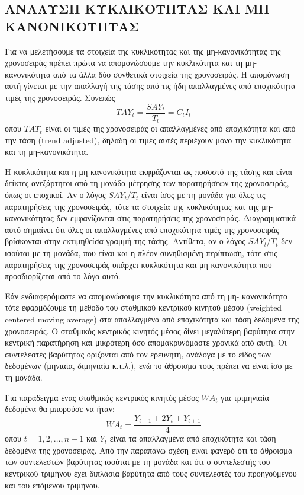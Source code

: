 \subsection{ΑΝΑΛΥΣΗ ΚΥΚΛΙΚΟΤΗΤΑΣ ΚΑΙ ΜΗ ΚΑΝΟΝΙΚΟΤΗΤΑΣ}
Για να μελετήσουμε τα στοιχεία της κυκλικότητας και της μη-κανονικότητας της
χρονοσειράς πρέπει πρώτα να απομονώσουμε την κυκλικότητα και τη μη-
κανονικότητα από τα άλλα δύο συνθετικά στοιχεία της χρονοσειράς. Η απομόνωση
αυτή γίνεται με την απαλλαγή της τάσης από τις ήδη απαλλαγμένες από εποχικότητα
τιμές της χρονοσειράς. Συνεπώς\\
$$ TAY_t=\frac{SAY_t}{T_t}=C_tI_t $$
όπου $TAΥ_t$ είναι οι τιμές της χρονοσειράς οι απαλλαγμένες από εποχικότητα και από
την τάση (trend adjusted), δηλαδή οι τιμές αυτές περιέχουν μόνο την κυκλικότητα και
τη μη-κανονικότητα.

Η κυκλικότητα και η μη-κανονικότητα εκφράζονται ως ποσοστό της τάσης και
είναι δείκτες ανεξάρτητοι από τη μονάδα μέτρησης των παρατηρήσεων της
χρονοσειράς, όπως οι εποχικοί. Αν ο λόγος $SAY_t/ T_t$ είναι ίσος με τη μονάδα για
όλες τις παρατηρήσεις της χρονοσειράς, τότε τα στοιχεία της κυκλικότητας και της
μη-κανονικότητας δεν εμφανίζονται στις παρατηρήσεις της χρονοσειράς.
Διαγραμματικά αυτό σημαίνει ότι όλες οι απαλλαγμένες από εποχικότητα τιμές της
χρονοσειράς βρίσκονται στην εκτιμηθείσα γραμμή της τάσης. Αντίθετα, αν ο λόγος
$SAY_t/ T_t$ δεν ισούται με τη μονάδα, που είναι και η πλέον συνηθισμένη περίπτωση,
τότε στις παρατηρήσεις της χρονοσειράς υπάρχει κυκλικότητα και μη-κανονικότητα
που προσδιορίζεται από το λόγο αυτό.

Εάν ενδιαφερόμαστε να απομονώσουμε την κυκλικότητα από τη μη-
κανονικότητα τότε εφαρμόζουμε τη μέθοδο του σταθμικού κεντρικού κινητού μέσου
(weighted centered moving average) στα απαλλαγμένα από εποχικότητα και τάση
δεδομένα της χρονοσειράς. Ο σταθμικός κεντρικός κινητός μέσος δίνει μεγαλύτερη
βαρύτητα στην κεντρική παρατήρηση και μικρότερη όσο απομακρυνόμαστε χρονικά
από αυτή. Οι συντελεστές βαρύτητας ορίζονται από τον ερευνητή, ανάλογα με το
είδος των δεδομένων (μηνιαία, διμηνιαία κ.τ.λ.), ενώ το άθροισμα τους πρέπει να
είναι ίσο με τη μονάδα.

Για παράδειγμα ένας σταθμικός κεντρικός κινητός μέσος $WA_t$ για τριμηνιαία
δεδομένα θα μπορούσε να ήταν:\\
$$ WA_t=\frac{Y_{t-1}+2Y_t+Y_{t+1}}{4} $$
όπου $t = 1, 2,\ldots,n-1$ και $Y_t$ είναι τα απαλλαγμένα από εποχικότητα και τάση
δεδομένα της χρονοσειράς. Από την παραπάνω σχέση είναι φανερό ότι το άθροισμα
των συντελεστών βαρύτητας ισούται με τη μονάδα και ότι ο συντελεστής του
κεντρικού τριμήνου έχει διπλάσια βαρύτητα από τους συντελεστές του προηγούμενου
και του επόμενου τριμήνου.

